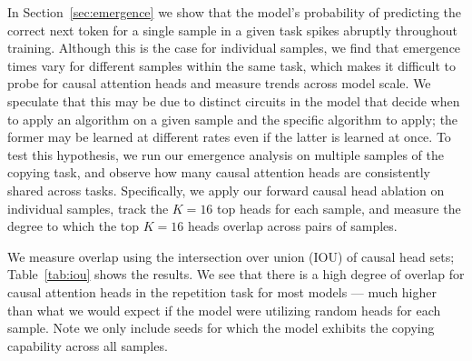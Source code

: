 \documentclass{article}
\begin{document}
In Section~\ref{sec:emergence} we show that the model's probability of predicting the correct next token for a single sample in a given task spikes abruptly throughout training. Although this is the case for individual samples, we find that emergence times vary for different samples within the same task, which makes it difficult to probe for causal attention heads and measure trends across model scale. We speculate that this may be due to distinct circuits in the model that decide when to apply an algorithm on a given sample and the specific algorithm to apply; the former may be learned at different rates even if the latter is learned at once. To test this hypothesis, we run our emergence analysis on multiple samples of the copying task, and observe how many causal attention heads are consistently shared across tasks. Specifically, we apply our forward causal head ablation on individual samples, track the $K=16$ top heads for each sample, and measure the degree to which the top $K=16$ heads overlap across pairs of samples. 

We measure overlap using the intersection over union (IOU) of causal head sets; Table~\ref{tab:iou} shows the results. We see that there is a high degree of overlap for causal attention heads in the repetition task for most models --- much higher than what we would expect if the model were utilizing random heads for each sample. Note we only include seeds for which the model exhibits the copying capability across all samples. 

\begin{table}[h]
\centering
\caption{\textbf{Overlap between causal heads for different samples of the copying task for Pythia 410m.} We select the top $K=16$ causal heads across multiple samples and compare the set overlaps between pairs of samples. Most models utilize many of the same attention heads to solve the copying task, even when the correct token probability spikes at different training steps for each sample. We compare to a random baseline $K / (2N-K)$, where $N$ is the number of non-sink heads from which we apply our causal ranking.}
\label{tab:iou}
\end{table}
\end{document}

